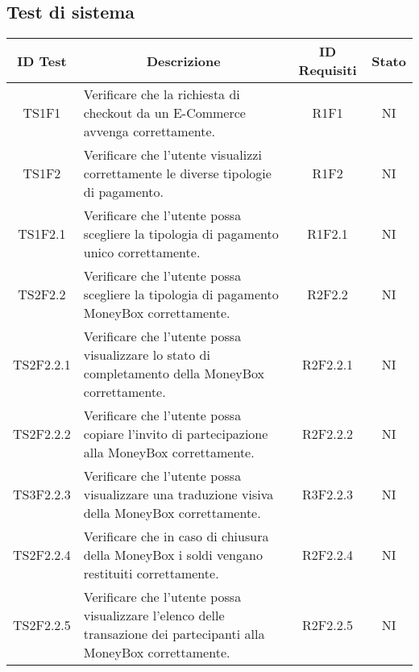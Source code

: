 \subsection{Test di sistema}\label{subsection:test_sistema}
\begin{table}[H]
  \centering
  \renewcommand{\arraystretch}{1.8}
  \begin{tabular}{c|p{8cm}|c|c}
    \rowcolor[HTML]{125E28}
    \color[HTML]{FFFFFF}\textbf{ID Test}
              & \multicolumn{1}{c}{\color[HTML]{FFFFFF}\textbf{Descrizione}}
              & \color[HTML]{FFFFFF}\textbf{ID Requisiti}
              & \color[HTML]{FFFFFF}\textbf{Stato}                                                                                                        \\
    \hline
    TS1F1     & Verificare che la richiesta di checkout da un E-Commerce\glo{} avvenga correttamente.                                     & R1F1     & NI \\
    TS1F2     & Verificare che l'utente visualizzi correttamente le diverse tipologie di pagamento.                                       & R1F2     & NI \\
    TS1F2.1   & Verificare che l'utente possa scegliere la tipologia di pagamento unico correttamente.                                    & R1F2.1   & NI \\
    TS2F2.2   & Verificare che l'utente possa scegliere la tipologia di pagamento MoneyBox\glo{} correttamente.                           & R2F2.2   & NI \\
    TS2F2.2.1 & Verificare che l'utente possa visualizzare lo stato di completamento della MoneyBox\glo{} correttamente.                  & R2F2.2.1 & NI \\
    TS2F2.2.2 & Verificare che l'utente possa copiare l'invito di partecipazione alla MoneyBox\glo{} correttamente.                       & R2F2.2.2 & NI \\
    TS3F2.2.3 & Verificare che l'utente possa visualizzare una traduzione visiva della MoneyBox\glo{} correttamente.                      & R3F2.2.3 & NI \\
    TS2F2.2.4 & Verificare che in caso di chiusura della MoneyBox\glo{} i soldi vengano restituiti correttamente.                         & R2F2.2.4 & NI \\
    TS2F2.2.5 & Verificare che l'utente possa visualizzare l'elenco delle transazione dei partecipanti alla MoneyBox\glo{} correttamente. & R2F2.2.5 & NI \\
  \end{tabular}
\end{table}

